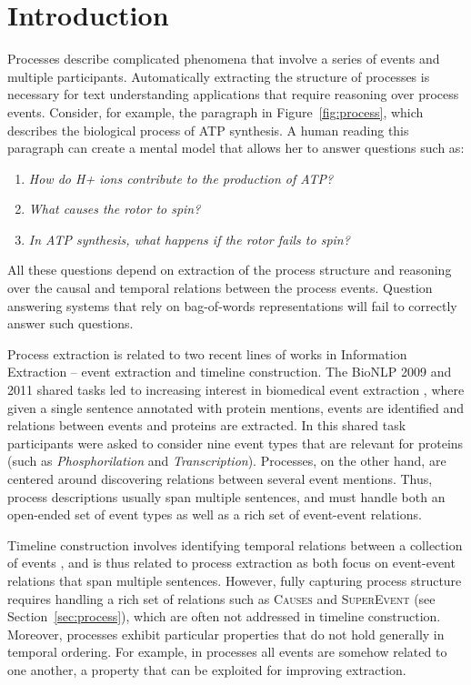 \section{Introduction}

Processes describe complicated phenomena that involve a series of events and multiple participants. Automatically extracting the structure of processes is necessary for text understanding applications that require reasoning over process events. Consider, for example, the paragraph in Figure~\ref{fig:process}, which describes the biological process of ATP synthesis. A human reading this paragraph can create a mental model that allows her to answer questions such as:

\begin{enumerate}[itemsep=0pt,topsep=0pt] 
\item \emph{How do H+ ions contribute to the production of ATP?}
\item \emph{What causes the rotor to spin?}
\item \emph{In ATP synthesis, what happens if the rotor fails to spin?}
\end{enumerate}

\noindent All these questions depend on extraction of the process structure and reasoning over the causal and temporal relations between the process events. Question answering systems that rely on bag-of-words representations will fail to correctly answer such questions.


Process extraction is related to two recent lines of works in Information Extraction -- event extraction and timeline construction. The BioNLP 2009 and 2011 shared tasks \cite{kim09,kim11} led to increasing interest in biomedical event extraction \cite{Poon10,Miwa10,riedel11fast,Mcclosky11,Bjorne11}, where given a single sentence annotated with protein mentions, events  are identified and relations between events and proteins are extracted. In this shared task participants were asked to consider nine event types that are relevant for proteins (such as \emph{Phosphorilation} and \emph{Transcription}). Processes, on the other hand,  are centered around discovering relations between several event mentions. Thus, process descriptions usually span multiple sentences, and must handle both an open-ended set of event types as well as a rich set of event-event relations.

Timeline construction involves identifying temporal relations between a collection of events \cite{Chambers08,Yoshikawa09,Denis11,Do12,Mcclosky12}, and is thus related to process extraction as both focus on event-event relations that span multiple sentences. However, fully capturing process structure requires handling a rich set of relations such as \textsc{Causes} and \textsc{SuperEvent} (see Section~\ref{sec:process}), which are often not addressed in timeline construction. Moreover, processes exhibit particular properties that do not hold generally in temporal ordering. For example, in processes all events are somehow related to one another, a property that can be exploited for improving extraction.

